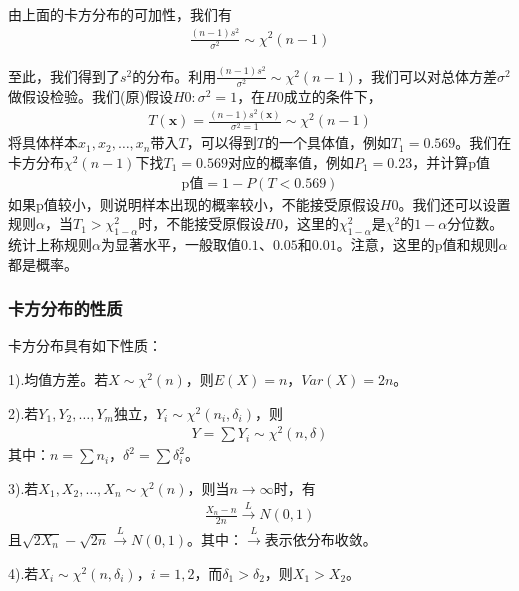         \par
        由上面的卡方分布的可加性，我们有
        \begin{align*}
        \frac{(n-1)s^2}{\sigma^2} \sim \chi^2(n-1)
        \end{align*}
        \par
        至此，我们得到了$s^2$的分布。利用$\frac{(n-1)s^2}{\sigma^2} \sim \chi^2(n-1)$，我们可以对总体方差$\sigma^2$做假设检验。我们(原)假设$H0:\sigma^2 = 1$，在$H0$成立的条件下，
        \begin{align*}
        T(\mathbf{x}) = \frac{(n-1)s^2(\mathbf{x})}{\sigma^2 = 1} \sim \chi^2(n-1)
        \end{align*}
        将具体样本$x_1,x_2,\dots,x_n$带入$T$，可以得到$T$的一个具体值，例如$T_1 = 0.569$。我们在卡方分布$\chi^2(n-1)$下找$T_1= 0.569$对应的概率值，例如$P_1 =0.23$，并计算p值
        \begin{align*}
        \text{p值} = 1 - P(T < 0.569)
        \end{align*}
        如果p值较小，则说明样本出现的概率较小，不能接受原假设$H0$。我们还可以设置规则$\alpha$，当$T_1>\chi^2_{1-\alpha}$时，不能接受原假设$H0$，这里的$\chi^2_{1-\alpha}$是$\chi^2$的$1-\alpha$分位数。统计上称规则$\alpha$为显著水平，一般取值$0.1$、$0.05$和$0.01$。注意，这里的p值和规则$\alpha$都是概率。
        \subsubsection{卡方分布的性质}
            卡方分布具有如下性质：
            \par
            1).均值方差。若$X\sim \chi ^2(n)$，则$E(X) = n$，$Var(X) = 2n$。
            \par
            2).若$Y_1,Y_2,\dots,Y_m$独立，$Y_i \sim \chi ^2(n_i,\delta_i)$，则
            \begin{align*}
            Y = \sum Y_i \sim \chi^2(n,\delta)
            \end{align*}
            其中：$n = \sum n_i$，$\delta^2 = \sum \delta_i^2$。
            \par
            3).若$X_1,X_2,\dots,X_n\sim \chi ^2(n)$，则当$n\rightarrow\infty$时，有
            \begin{align*}
            \frac{X_n -n }{2n} \xrightarrow{L} N(0,1)
            \end{align*}
            且$\sqrt{2X_n}- \sqrt{2n} \xrightarrow{L}N(0,1)$。其中：$\xrightarrow{L}$表示依分布收敛。
            \par
            4).若$X_i \sim \chi^2(n,\delta_i)$，$i = 1,2$，而$\delta_1>\delta_2$，则$X_1>X_2$。

